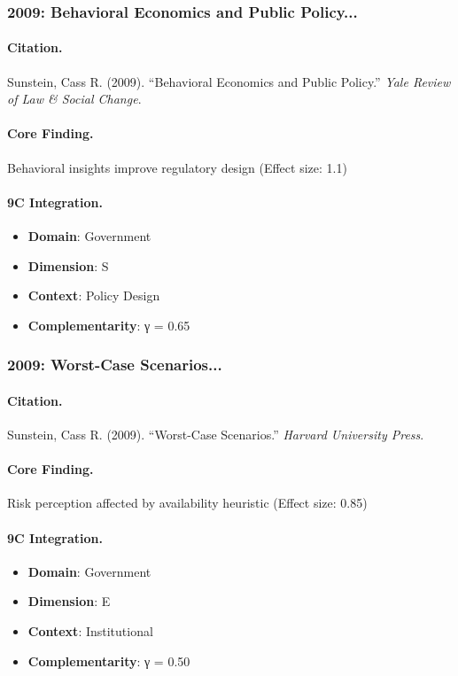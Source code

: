 \subsubsection{2009: Behavioral Economics and Public Policy...}

\paragraph{Citation.}
Sunstein, Cass R. (2009). ``Behavioral Economics and Public Policy.''
\textit{Yale Review of Law & Social Change}.

\paragraph{Core Finding.}
Behavioral insights improve regulatory design (Effect size: 1.1)

\paragraph{9C Integration.}
\begin{itemize}[nosep]
  \item \textbf{Domain}: Government
  \item \textbf{Dimension}: S
  \item \textbf{Context}: Policy Design
  \item \textbf{Complementarity}: γ = 0.65
\end{itemize}

\subsubsection{2009: Worst-Case Scenarios...}

\paragraph{Citation.}
Sunstein, Cass R. (2009). ``Worst-Case Scenarios.''
\textit{Harvard University Press}.

\paragraph{Core Finding.}
Risk perception affected by availability heuristic (Effect size: 0.85)

\paragraph{9C Integration.}
\begin{itemize}[nosep]
  \item \textbf{Domain}: Government
  \item \textbf{Dimension}: E
  \item \textbf{Context}: Institutional
  \item \textbf{Complementarity}: γ = 0.50
\end{itemize}

